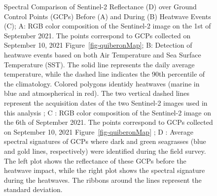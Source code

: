 \documentclass[
  number]{elsarticle}
\begin{document}
\label{cell-fig-S2_comparison}
\begin{figure}[H]


\caption{\label{fig-S2_comparison}Spectral Comparison of Sentinel-2
Reflectance (D) over Ground Control Points (GCPs) Before (A) and During
(B) Heatwave Events (C); A: RGB color composition of the Sentinel-2
image on the 1st of September 2021. The points correspond to GCPs
collected on September 10, 2021 Figure~\ref{fig-quiberonMap}; B:
Detection of heatwave events based on both Air Temperature and Sea
Surface Temperature (SST). The solid line represents the daily average
temperature, while the dashed line indicates the 90th percentile of the
climatology. Colored polygons identidy heatwaves (marine in blue and
atmospherical in red). The two vertical dashed lines represent the
acquisition dates of the two Sentinel-2 images used in this analysis ; C
: RGB color composition of the Sentinel-2 image on the 6th of September
2021. The points correspond to GCPs collected on September 10, 2021
Figure~\ref{fig-quiberonMap} ; D : Average spectral signatures of GCPs
where dark and green seagrasses (blue and gold lines, respectively) were
identified during the field survey. The left plot shows the reflectance
of these GCPs before the heatwave impact, while the right plot shows the
spectral signature during the heatwaves. The ribbons around the lines
represent the standard deviation.}

\end{figure}%
\end{document}
